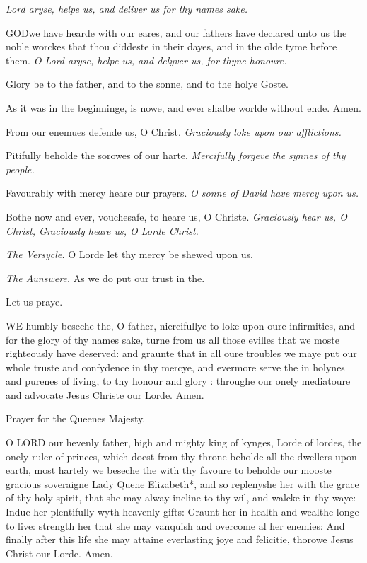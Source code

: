 \emph{Lord aryse, helpe us, and deliver us for thy names
sake.}

GOD\textbf{}we have hearde with our eares, and our fathers have declared unto
us the noble worckes that thou diddeste in their dayes, and in the olde
tyme before them.
\emph{O
Lord aryse, helpe us, and delyver us, for thyne honoure.}

Glory be to the father, and to the sonne, and to the holye Goste.

As it was in the beginninge, is nowe, and ever shalbe
worlde without ende. Amen.

From our enemues defende us, O Christ.
\emph{Graciously
loke upon our afflictions.}

Pitifully beholde the sorowes of our harte.
\emph{Mercifully
forgeve the synnes of thy people.}

Favourably with mercy heare our prayers.
\emph{O
sonne of David have mercy upon us.}

Bothe now and ever, vouchesafe, to heare us, O Christe.
\emph{Graciously
hear us, O Christ, Graciously heare us, O Lorde Christ.}

\emph{The Versycle.} O Lorde let thy mercy be shewed upon us.

\emph{The Aunswere.} As we do put our trust in the.

Let
us praye.

WE
humbly beseche the, O father, niercifullye to loke upon oure infirmities,
and for the glory of thy names sake, turne from us all those evilles that
we moste righteously have deserved: and graunte that in all oure troubles
we maye put our whole truste and confydence in thy mercye, and evermore
serve the in holynes and purenes of living, to thy honour and glory :
throughe our onely mediatoure and advocate Jesus Christe our Lorde. Amen.

Prayer
for the Queenes Majesty.

O
LORD our hevenly father, high and mighty king of kynges, Lorde of lordes,
the onely ruler of princes, which doest from thy throne beholde all the
dwellers upon earth, most hartely we beseche the with thy favoure to beholde
our mooste gracious soveraigne Lady Quene Elizabeth*, and so replenyshe
her with the grace of thy holy spirit, that she may alway incline to thy
wil, and walcke in thy waye: Indue her plentifully wyth heavenly gifts:
Graunt her in health and wealthe longe to live: strength her that she
may vanquish and overcome al her enemies: And finally after this life
she may attaine everlasting joye and felicitie, thorowe Jesus Christ our
Lorde. Amen. 

